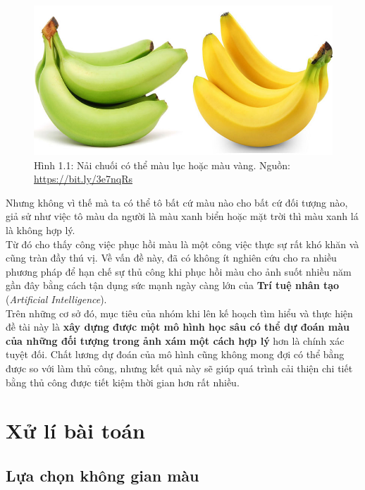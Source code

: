 \documentclass[a4paper]{article}
\begin{document}
\begin{figure}[h!]
\centering
\includegraphics[width=15cm]{images/1_1.jpg}
\caption{Hình 1.1: Nải chuối có thể màu lục hoặc màu vàng. Nguồn: \href{https://bit.ly/3e7nqRs}{https://bit.ly/3e7nqRs}}
\end{figure}

\noindent
Nhưng không vì thế mà ta có thể tô bất cứ màu nào cho bất cứ đối tượng nào, giả sử như việc tô màu da người là màu xanh biển hoặc mặt trời thì màu xanh lá là không hợp lý.\\

\noindent
Từ đó cho thấy công việc phục hồi màu là một công việc thực sự rất khó khăn và cũng tràn đầy thú vị. Về vấn đề này, đã có không ít nghiên cứu cho ra nhiều phương pháp để hạn chế sự thủ công khi phục hồi màu cho ảnh suốt nhiều năm gần đây bằng cách tận dụng sức mạnh ngày càng lớn của \textbf{Trí tuệ nhân tạo} (\textit{Artificial Intelligence}).\\

\noindent
Trên những cơ sở đó, mục tiêu của nhóm khi lên kế hoạch tìm hiểu và thực hiện đề tài này là \textbf{xây dựng được một mô hình học sâu có thể dự đoán màu của những đối tượng trong ảnh xám một cách hợp lý} hơn là chính xác tuyệt đối. Chất lương dự đoán của mô hình cũng không mong đợi có thể bằng được so với làm thủ công, nhưng kết quả này sẽ giúp quá trình cải thiện chi tiết bằng thủ công được tiết kiệm thời gian hơn rất nhiều.

\section{Xử lí bài toán}

\subsection{Lựa chọn không gian màu}
\end{document}

